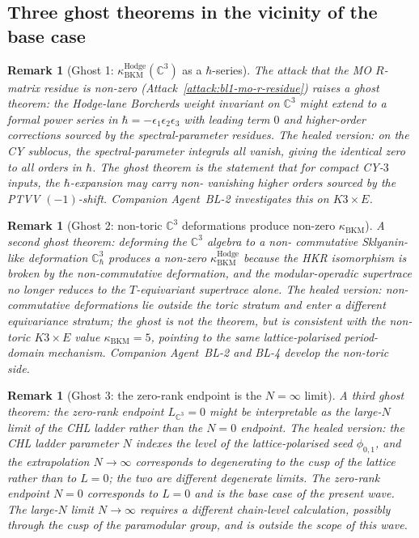 \documentclass[11pt]{article}
\newtheorem{remark}[theorem]{Remark}
\providecommand{\C}{\mathbb{C}}
\providecommand{\kBKM}{\kappa_{\mathrm{BKM}}}
\begin{document}
\subsection{Three ghost theorems in the vicinity of the base case}
\label{subsec:bl1-three-ghosts}

\begin{remark}[Ghost 1: $\kBKM^{\mathrm{Hodge}}(\C^3)$ as a $\hbar$-series]
\label{rem:bl1-ghost-1-hbar-series}
The attack that the MO $R$-matrix residue is non-zero
(Attack~\ref{attack:bl1-mo-r-residue}) raises a ghost theorem: the
Hodge-lane Borcherds weight invariant on $\C^3$ might extend to a
\emph{formal power series} in $\hbar = -\epsilon_1 \epsilon_2 \epsilon_3$
with leading term $0$ and higher-order corrections sourced by the
spectral-parameter residues. The healed version: on the CY sublocus,
the spectral-parameter integrals all vanish, giving the identical zero
to all orders in $\hbar$. The ghost theorem is the statement that for
\emph{compact} CY-$3$ inputs, the $\hbar$-expansion may carry non-
vanishing higher orders sourced by the PTVV $(-1)$-shift. Companion
Agent~BL-2 investigates this on $K3 \times E$.
\end{remark}

\begin{remark}[Ghost 2: non-toric $\C^3$ deformations produce non-zero
$\kBKM$]
\label{rem:bl1-ghost-2-noncommutative}
A second ghost theorem: deforming the $\C^3$ algebra to a non-
commutative Sklyanin-like deformation $\C_{\hbar}^3$ produces a
non-zero $\kBKM^{\mathrm{Hodge}}$ because the HKR isomorphism is
broken by the non-commutative deformation, and the modular-operadic
supertrace no longer reduces to the $T$-equivariant supertrace alone.
The healed version: non-commutative deformations lie outside the
toric stratum and enter a different equivariance stratum; the ghost is
not the theorem, but is consistent with the non-toric $K3 \times E$
value $\kBKM = 5$, pointing to the same lattice-polarised period-
domain mechanism. Companion Agent~BL-2 and BL-4 develop the
non-toric side.
\end{remark}

\begin{remark}[Ghost 3: the zero-rank endpoint is the $N = \infty$ limit]
\label{rem:bl1-ghost-3-large-n-limit}
A third ghost theorem: the zero-rank endpoint $L_{\C^3} = 0$ might be
interpretable as the large-$N$ limit of the CHL ladder rather than the
$N = 0$ endpoint. The healed version: the CHL ladder parameter $N$
indexes the level of the lattice-polarised seed $\phi_{0,1}$, and the
extrapolation $N \to \infty$ corresponds to degenerating to the cusp
of the lattice rather than to $L = 0$; the two are different degenerate
limits. The zero-rank endpoint $N = 0$ corresponds to $L = 0$ and is
the base case of the present wave. The large-$N$ limit $N \to \infty$
requires a different chain-level calculation, possibly through the
cusp of the paramodular group, and is outside the scope of this wave.
\end{remark}
\end{document}
